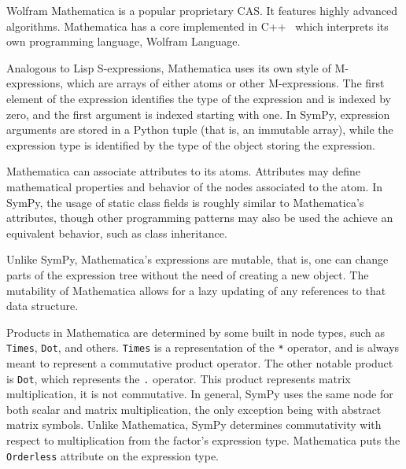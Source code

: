 
Wolfram Mathematica is a popular proprietary CAS\@.
It features highly advanced algorithms.
Mathematica has a core implemented in C++~\cite{Wolfram2016}
which interprets its own programming language, Wolfram Language.


Analogous to Lisp S-expressions,
Mathematica uses its own style of M-expres\-sions,
which are arrays of either atoms or other M-expressions.
The first element of the expression identifies the type of the expression
and is indexed by zero, and the first argument is indexed starting with one.
In SymPy, expression arguments are stored in a Python tuple
(that is, an immutable array),
while the expression type is identified by the type of the object storing the
expression.


Mathematica can associate attributes to its atoms.
Attributes may define mathematical properties and behavior of the nodes
associated to the atom.
In SymPy, the usage of static class fields is roughly similar to Mathematica's
attributes, though other programming patterns may also be used the achieve an
equivalent behavior, such as class inheritance.


Unlike SymPy, Mathematica's expressions are mutable,
that is, one can change parts of the expression tree without the need of
creating a new object.
The mutability of Mathematica allows for a lazy updating of any references
to that data structure.


Products in Mathematica are determined by some built in node types, such as
\texttt{Times}, \texttt{Dot}, and others.  \texttt{Times} is a representation of
the \texttt{*} operator, and is always meant to represent a commutative product
operator.  The other notable product is \texttt{Dot}, which represents the
\texttt{.} operator.  This product represents matrix multiplication, it is not
commutative.  In general, SymPy uses the same node for both scalar and matrix
multiplication, the only exception being with abstract matrix symbols.  Unlike
Mathematica, SymPy determines commutativity with respect to multiplication from
the factor's expression type.  Mathematica puts the \texttt{Orderless} attribute
on the expression type.


